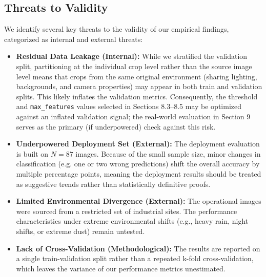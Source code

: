 \documentclass[11pt,a4paper]{article}
\begin{document}
\subsection{Threats to Validity}
\label{sec:threats_to_validity}
We identify several key threats to the validity of our empirical findings, categorized as internal and external threats:
\begin{itemize}
  \item \textbf{Residual Data Leakage (Internal):} While we stratified the validation split, partitioning at the individual crop level rather than the source image level means that crops from the same original environment (sharing lighting, backgrounds, and camera properties) may appear in both train and validation splits. This likely inflates the validation metrics. Consequently, the threshold and \texttt{max\_features} values selected in Sections 8.3--8.5 may be optimized against an inflated validation signal; the real-world evaluation in Section 9 serves as the primary (if underpowered) check against this risk.
  \item \textbf{Underpowered Deployment Set (External):} The deployment evaluation is built on $N=87$ images. Because of the small sample size, minor changes in classification (e.g. one or two wrong predictions) shift the overall accuracy by multiple percentage points, meaning the deployment results should be treated as suggestive trends rather than statistically definitive proofs.
  \item \textbf{Limited Environmental Divergence (External):} The operational images were sourced from a restricted set of industrial sites. The performance characteristics under extreme environmental shifts (e.g., heavy rain, night shifts, or extreme dust) remain untested.
  \item \textbf{Lack of Cross-Validation (Methodological):} The results are reported on a single train-validation split rather than a repeated k-fold cross-validation, which leaves the variance of our performance metrics unestimated.
\end{itemize}
\end{document}
